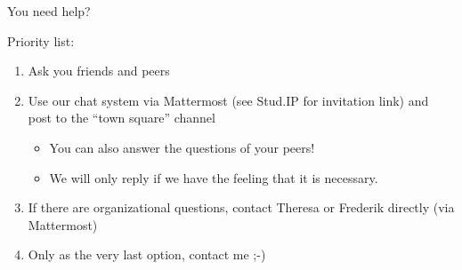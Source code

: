 \begin{frame}[c]{You need help?}
	
Priority list:
	\begin{enumerate}
		\item Ask you friends and peers
		\item Use our chat system via Mattermost (see Stud.IP for invitation link) and post to the ``town square'' channel
		\begin{itemize}
			\item You can also answer the questions of your peers! 
			\item We will only reply if we have the feeling that it is necessary.
		\end{itemize}
		\item If there are organizational questions, contact Theresa or Frederik directly (via Mattermost)
		\item Only as the very last option, contact me ;-)
	\end{enumerate}
	
\end{frame}
